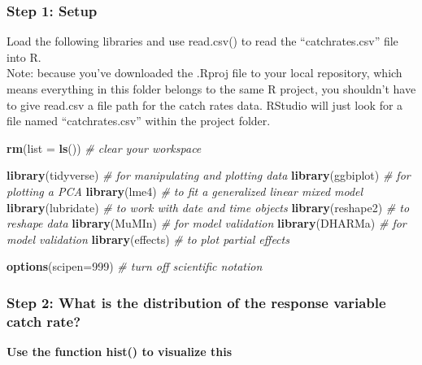 \documentclass[]{article}
\newenvironment{Shaded}{\begin{snugshade}}{\end{snugshade}}
\newcommand{\CommentTok}[1]{\textcolor[rgb]{0.56,0.35,0.01}{\textit{#1}}}
\newcommand{\DataTypeTok}[1]{\textcolor[rgb]{0.13,0.29,0.53}{#1}}
\newcommand{\DecValTok}[1]{\textcolor[rgb]{0.00,0.00,0.81}{#1}}
\newcommand{\KeywordTok}[1]{\textcolor[rgb]{0.13,0.29,0.53}{\textbf{#1}}}
\newcommand{\NormalTok}[1]{#1}
\begin{document}
\hypertarget{step-1-setup}{%
\subsubsection{Step 1: Setup}\label{step-1-setup}}

Load the following libraries and use read.csv() to read the
``catchrates.csv'' file into R.\\
Note: because you've downloaded the .Rproj file to your local
repository, which means everything in this folder belongs to the same R
project, you shouldn't have to give read.csv a file path for the catch
rates data. RStudio will just look for a file named ``catchrates.csv''
within the project folder.

\begin{Shaded}
\begin{Highlighting}[]
\KeywordTok{rm}\NormalTok{(}\DataTypeTok{list =} \KeywordTok{ls}\NormalTok{())       }\CommentTok{# clear your workspace}

\KeywordTok{library}\NormalTok{(tidyverse)    }\CommentTok{# for manipulating and plotting data}
\KeywordTok{library}\NormalTok{(ggbiplot)     }\CommentTok{# for plotting a PCA}
\KeywordTok{library}\NormalTok{(lme4)         }\CommentTok{# to fit a generalized linear mixed model}
\KeywordTok{library}\NormalTok{(lubridate)    }\CommentTok{# to work with date and time objects}
\KeywordTok{library}\NormalTok{(reshape2)     }\CommentTok{# to reshape data}
\KeywordTok{library}\NormalTok{(MuMIn)        }\CommentTok{# for model validation}
\KeywordTok{library}\NormalTok{(DHARMa)       }\CommentTok{# for model validation}
\KeywordTok{library}\NormalTok{(effects)      }\CommentTok{# to plot partial effects}

\KeywordTok{options}\NormalTok{(}\DataTypeTok{scipen=}\DecValTok{999}\NormalTok{)   }\CommentTok{# turn off scientific notation}
\end{Highlighting}
\end{Shaded}

\hypertarget{step-2-what-is-the-distribution-of-the-response-variable-catch-rate}{%
\subsubsection{Step 2: What is the distribution of the response variable
catch
rate?}\label{step-2-what-is-the-distribution-of-the-response-variable-catch-rate}}

\textbf{Use the function hist() to visualize this}
\end{document}
